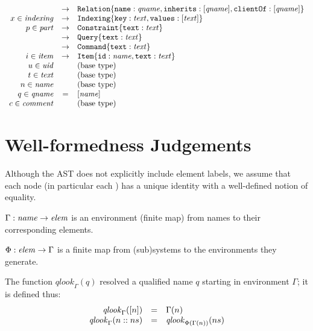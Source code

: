 \documentclass{article}
\begin{document}
\[\begin{array}{rcll}
                  & \rightarrow & \texttt{Relation}\{\texttt{name}:\mathit{qname},\texttt{inherits}:[{\mathit{qname}}],
                                                  \texttt{clientOf}:[{\mathit{qname}}]\} \\
  x \in \mathit{indexing} & \rightarrow & \texttt{Indexing}\{\texttt{key}:\mathit{text},\texttt{values}:[{\mathit{text}}]\} \\
  p \in \mathit{part} & \rightarrow & \texttt{Constraint}\{\texttt{text}:\mathit{text} \} \\
                  & \rightarrow & \texttt{Query}\{\texttt{text}:\mathit{text}\} \\
                  & \rightarrow & \texttt{Command}\{\texttt{text}:\mathit{text}\} \\
  i \in \mathit{item} & \rightarrow & \texttt{Item}\{\texttt{id}:\mathit{name},\texttt{text}:\mathit{text} \} \\
  u \in \mathit{uid} & & \text{(base type)} \\
  t \in \mathit{text}& & \text{(base type)} \\
  n \in \mathit{name}& & \text{(base type)} \\
  q \in \mathit{qname}& = & [{\mathit{name}}] \\
  c \in \mathit{comment}&  & \text{(base type)} \\
\end{array}
\]
  
\vfill\eject

\section{Well-formedness Judgements}

\newcommand{\senv}{\Phi}
\newcommand{\env}{\Gamma}
\newcommand{\qlookup}[2]{\mathit{qlook}_{#1}({#2})}
\newcommand{\qnames}[1]{\mathit{qnames}({#1})}
\newcommand{\nocycles}[1]{\mathit{nocycles}({#1})}

Although the AST does not explicitly include element labels, we assume that each node (in particular each ) 
has a unique identity with a well-defined notion of equality.

$\env : \nt{name} \rightarrow \nt{elem}$ is an environment (finite map) from names
to their corresponding elements.

$\senv : \nt{elem} \rightarrow \env$ is a finite map from (sub)systems
to the environments they generate. 

The function $\qlookup{\env}{q}$ resolved a qualified name $q$ starting in environment $\env$; it is defined thus:
\[
\begin{array}{rcl}
\qlookup{\env}{\singlelist{n}} &= &\env(n) \\
\qlookup{\env}{\conslist{n}{ns}} & =& \qlookup{\senv(\env(n))}{ns}
\end{array}
\]
\end{document}
